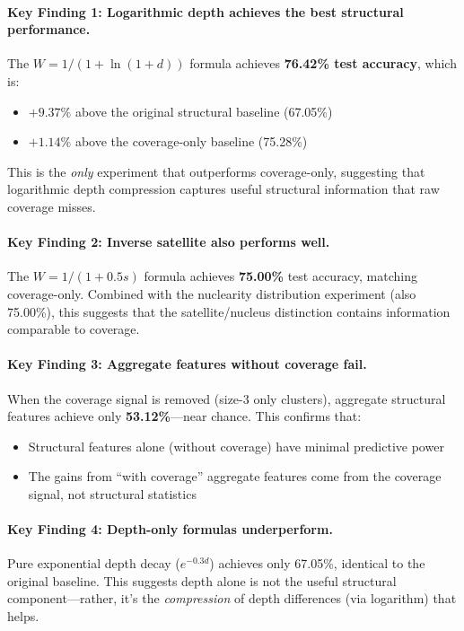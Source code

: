 \documentclass[12pt,a4paper]{article}
\begin{document}
\paragraph{Key Finding 1: Logarithmic depth achieves the best structural performance.}
The $W = 1/(1+\ln(1+d))$ formula achieves \textbf{76.42\% test accuracy}, which is:
\begin{itemize}
\item $+9.37\%$ above the original structural baseline (67.05\%)
\item $+1.14\%$ above the coverage-only baseline (75.28\%)
\end{itemize}
This is the \textit{only} experiment that outperforms coverage-only, suggesting that
logarithmic depth compression captures useful structural information that raw coverage misses.

\paragraph{Key Finding 2: Inverse satellite also performs well.}
The $W = 1/(1+0.5s)$ formula achieves \textbf{75.00\%} test accuracy, matching coverage-only.
Combined with the nuclearity distribution experiment (also 75.00\%), this suggests that
the satellite/nucleus distinction contains information comparable to coverage.

\paragraph{Key Finding 3: Aggregate features without coverage fail.}
When the coverage signal is removed (size-3 only clusters), aggregate structural features
achieve only \textbf{53.12\%}---near chance. This confirms that:
\begin{itemize}
\item Structural features alone (without coverage) have minimal predictive power
\item The gains from ``with coverage'' aggregate features come from the coverage signal, not structural statistics
\end{itemize}

\paragraph{Key Finding 4: Depth-only formulas underperform.}
Pure exponential depth decay ($e^{-0.3d}$) achieves only 67.05\%, identical to the original baseline.
This suggests depth alone is not the useful structural component---rather, it's the
\textit{compression} of depth differences (via logarithm) that helps.
\end{document}
